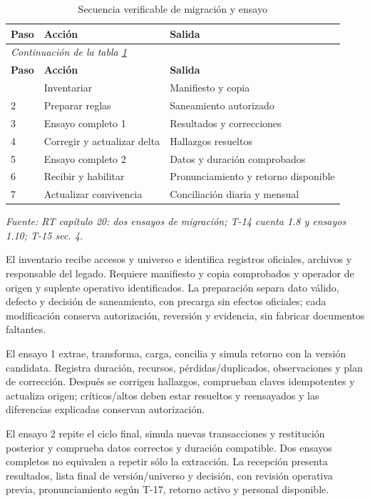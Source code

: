 \begingroup\small\setlength{\tabcolsep}{3pt}
\begin{longtable}{p{}p{}p{}}
\caption{Secuencia verificable de migración y ensayo}\label{tab:t18-ensayos}\\\hline
\textbf{Paso} & \textbf{Acción} & \textbf{Salida}\\\hline\endfirsthead
\multicolumn{3}{l}{\textit{Continuación de la tabla \ref{tab:t18-ensayos}}}\\\hline
\textbf{Paso} & \textbf{Acción} & \textbf{Salida}\\\hline\endhead
\hline\endfoot\hline\endlastfoot
1 & Inventariar & Manifiesto y copia\\\hline
2 & Preparar reglas & Saneamiento autorizado\\\hline
3 & Ensayo completo 1 & Resultados y correcciones\\\hline
4 & Corregir y actualizar delta & Hallazgos resueltos\\\hline
5 & Ensayo completo 2 & Datos y duración comprobados\\\hline
6 & Recibir y habilitar & Pronunciamiento y retorno disponible\\\hline
7 & Actualizar convivencia & Conciliación diaria y mensual\\\hline
\end{longtable}\endgroup
\noindent\textit{Fuente: RT capítulo 20: dos ensayos de migración; T-14 cuenta 1.8 y ensayos 1.10; T-15 sec. 4.}

El inventario recibe accesos y universo e identifica registros oficiales, archivos y responsable del legado. Requiere manifiesto y copia comprobados y operador de origen y suplente operativo identificados. La preparación separa dato válido, defecto y decisión de saneamiento, con precarga sin efectos oficiales; cada modificación conserva autorización, reversión y evidencia, sin fabricar documentos faltantes.

El ensayo 1 extrae, transforma, carga, concilia y simula retorno con la versión candidata. Registra duración, recursos, pérdidas/duplicados, observaciones y plan de corrección. Después se corrigen hallazgos, comprueban claves idempotentes y actualiza origen; críticos/altos deben estar resueltos y reensayados y las diferencias explicadas conservan autorización.

El ensayo 2 repite el ciclo final, simula nuevas transacciones y restitución posterior y comprueba datos correctos y duración compatible. Dos ensayos completos no equivalen a repetir sólo la extracción. La recepción presenta resultados, lista final de versión/universo y decisión, con revisión operativa previa, pronunciamiento según T-17, retorno activo y personal disponible.

